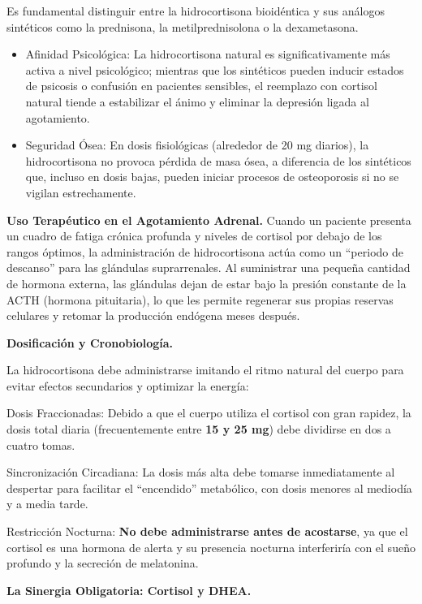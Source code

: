 \documentclass[
  spanish,
]{article}
\begin{document}
Es fundamental distinguir entre la hidrocortisona bioidéntica y sus análogos sintéticos como la prednisona, la metilprednisolona o la dexametasona.

\begin{itemize}
\item
  Afinidad Psicológica: La hidrocortisona natural es significativamente más activa a nivel psicológico; mientras que los sintéticos pueden inducir estados de psicosis o confusión en pacientes sensibles, el reemplazo con cortisol natural tiende a estabilizar el ánimo y eliminar la depresión ligada al agotamiento.
\item
  Seguridad Ósea: En dosis fisiológicas (alrededor de 20 mg diarios), la hidrocortisona no provoca pérdida de masa ósea, a diferencia de los sintéticos que, incluso en dosis bajas, pueden iniciar procesos de osteoporosis si no se vigilan estrechamente.
\end{itemize}

\textbf{Uso Terapéutico en el Agotamiento Adrenal.}
Cuando un paciente presenta un cuadro de fatiga crónica profunda y niveles de cortisol por debajo de los rangos óptimos, la administración de hidrocortisona actúa como un ``periodo de descanso'' para las glándulas suprarrenales. Al suministrar una pequeña cantidad de hormona externa, las glándulas dejan de estar bajo la presión constante de la ACTH (hormona pituitaria), lo que les permite regenerar sus propias reservas celulares y retomar la producción endógena meses después.

\textbf{Dosificación y Cronobiología.}

La hidrocortisona debe administrarse imitando el ritmo natural del cuerpo para evitar efectos secundarios y optimizar la energía:

Dosis Fraccionadas: Debido a que el cuerpo utiliza el cortisol con gran rapidez, la dosis total diaria (frecuentemente entre \textbf{15 y 25 mg}) debe dividirse en dos a cuatro tomas.

Sincronización Circadiana: La dosis más alta debe tomarse inmediatamente al despertar para facilitar el ``encendido'' metabólico, con dosis menores al mediodía y a media tarde.

Restricción Nocturna: \textbf{No debe administrarse antes de acostarse}, ya que el cortisol es una hormona de alerta y su presencia nocturna interferiría con el sueño profundo y la secreción de melatonina.

\textbf{La Sinergia Obligatoria: Cortisol y DHEA.}
\end{document}
